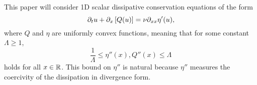 %
%
%
%
%
%
%
%
%
%
%
%
%

This paper will consider 1D scalar dissipative conservation equations of the form
\begin{equation} \label{eq:main} 
\partial_t u + \partial_x\left[ Q(u) \right] = \nu \partial_{xx} \eta'(u), 
\end{equation}
where $Q$ and $\eta$ are uniformly convex functions, meaning that for some constant $\Lambda \geq 1$,
\begin{equation} \label{convexity condition}
\frac{1}{\Lambda} \leq \eta''(x), Q''(x) \leq \Lambda
\end{equation}
holds for all $x \in \mathbb{R}$.  This bound on $\eta''$ is natural because $\eta''$ measures the coercivity of the dissipation in divergence form.

